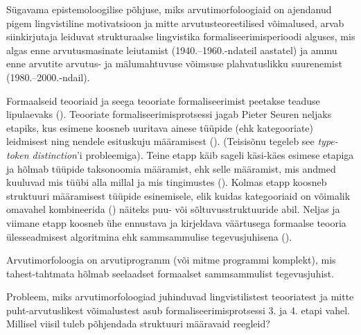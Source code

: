 \documentclass[12pt,a4paper]{article}
\begin{document}
Sügavama epistemoloogilise põhjuse, miks arvutimorfoloogiaid on ajendanud pigem lingvistiline motivatsioon ja mitte arvutusteoreetilised võimalused, arvab siinkirjutaja leiduvat strukturaalse lingvistika formaliseerimisperioodi alguses, mis algas enne arvutusmasinate leiutamist (1940.--1960.-ndateil aastatel) ja ammu enne arvutite arvutus- ja mälumahtuvuse võimsuse plahvatuslikku suurenemist (1980.--2000.-ndail). %

Formaalseid teooriaid ja seega teooriate formaliseerimist peetakse teaduse lipulaevaks (\cite[2026]{auroux_history_2006}). Teooriate formaliseerimis\-protsessi jagab Pieter Seuren neljaks etapiks, kus esimene koosneb uuritava ainese tüüpide (ehk kategooriate) leidmisest ning nendele esitus\-kuju määramisest (\cite[2027]{auroux_history_2006}). (Teisisõnu tegeleb see \textit{type-token distinction}'i probleemiga). Teine etapp käib sageli käsi-käes esimese etapiga ja hõlmab tüüpide taksonoomia määramist, ehk selle määramist, mis andmed kuuluvad mis tüübi alla millal ja mis tingimustes (\cite[2027]{auroux_history_2006}). Kolmas etapp koosneb struktuuri määramisest tüüpide esinemisele, elik kuidas kategooriaid on võimalik omavahel kombineerida (\cite[2027 jj]{auroux_history_2006}) näiteks puu- või sõltuvus\-struktuuride abil. Neljas ja viimane etapp koosneb ühe ennustava ja kirjeldava väärtusega formaalse teooria ülesseadmisest algoritmina ehk sammsammulise tegevusjuhisena (\cite[2031]{auroux_history_2006}).

Arvutimorfoloogia on arvutiprogramm (või mitme programmi komplekt), mis tahest-tahtmata hõlmab seelaadset formaalset sammsammulist tegevusjuhist.

Probleem, miks arvutimorfoloogiad juhinduvad lingvistilistest teooriatest ja mitte puht-arvutuslikest võimalustest asub formaliseerimis\-protsessi 3. ja 4. etapi vahel. Millisel viisil tuleb põhjendada struktuuri määravaid reegleid?
\end{document}

